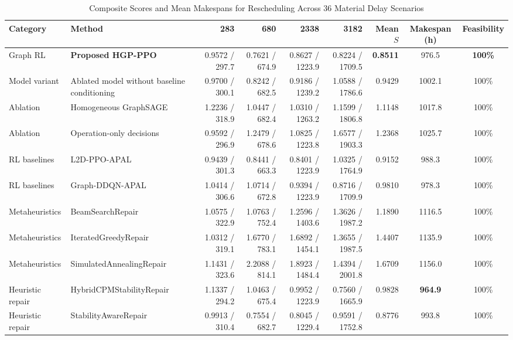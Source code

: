 \documentclass[journal,10pt]{IEEEtran}
\renewcommand{\arraystretch}{1.06}
\begin{document}
\begin{table}[!t]
\centering
\caption{Composite Scores and Mean Makespans for Rescheduling Across 36 Material Delay Scenarios}
\label{tab:resched_master}
\setlength{\tabcolsep}{6pt}
\renewcommand{\arraystretch}{1.06}
\begin{adjustbox}{max width=\textwidth}
\begin{tabular}{@{}llrrrrrcc@{}}
\toprule
\textbf{Category} & \textbf{Method} & \textbf{283} & \textbf{680} & \textbf{2338} & \textbf{3182} & \textbf{Mean $S$} & \textbf{Makespan (h)} & \textbf{Feasibility} \\
\midrule
Graph RL & \textbf{Proposed HGP-PPO} & 0.9572 / 297.7 & 0.7621 / 674.9 & 0.8627 / 1223.9 & 0.8224 / 1709.5 & \textbf{0.8511} & 976.5 & \textbf{100\%} \\
Model variant & Ablated model without baseline conditioning & 0.9700 / 300.1 & 0.8242 / 682.5 & 0.9186 / 1239.2 & 1.0588 / 1786.6 & 0.9429 & 1002.1 & 100\% \\
Ablation & Homogeneous GraphSAGE & 1.2236 / 318.9 & 1.0447 / 682.4 & 1.0310 / 1263.2 & 1.1599 / 1806.8 & 1.1148 & 1017.8 & 100\% \\
Ablation & Operation-only decisions & 0.9592 / 296.9 & 1.2479 / 678.6 & 1.0825 / 1223.8 & 1.6577 / 1903.3 & 1.2368 & 1025.7 & 100\% \\
RL baselines & L2D-PPO-APAL & 0.9439 / 301.3 & 0.8441 / 663.3 & 0.8401 / 1223.9 & 1.0325 / 1764.9 & 0.9152 & 988.3 & 100\% \\
RL baselines & Graph-DDQN-APAL & 1.0414 / 306.6 & 1.0714 / 672.8 & 0.9394 / 1223.9 & 0.8716 / 1709.9 & 0.9810 & 978.3 & 100\% \\
Metaheuristics & BeamSearchRepair & 1.0575 / 322.9 & 1.0763 / 752.4 & 1.2596 / 1403.6 & 1.3626 / 1987.2 & 1.1890 & 1116.5 & 100\% \\
Metaheuristics & IteratedGreedyRepair & 1.0312 / 319.1 & 1.6770 / 783.1 & 1.6892 / 1454.1 & 1.3655 / 1987.5 & 1.4407 & 1135.9 & 100\% \\
Metaheuristics & SimulatedAnnealingRepair & 1.1431 / 323.6 & 2.2088 / 814.1 & 1.8923 / 1484.4 & 1.4394 / 2001.8 & 1.6709 & 1156.0 & 100\% \\
Heuristic repair & HybridCPMStabilityRepair & 1.1337 / 294.2 & 1.0463 / 675.4 & 0.9952 / 1223.9 & 0.7560 / 1665.9 & 0.9828 & \textbf{964.9} & 100\% \\
Heuristic repair & StabilityAwareRepair & 0.9913 / 310.4 & 0.7554 / 682.7 & 0.8045 / 1229.4 & 0.9591 / 1752.8 & 0.8776 & 993.8 & 100\% \\

\end{tabular}
\end{adjustbox}
\end{table}
\end{document}
